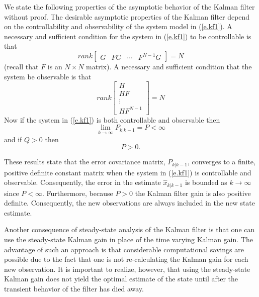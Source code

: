 	We state the following properties of the
asymptotic behavior of the Kalman filter without
proof.  The desirable asymptotic properties of the Kalman
filter depend on the controllability and observability of
the system model in (\ref{e.kf1}).  A necessary
and sufficient condition for the system in (\ref{e.kf1}) to be
controllable is that
%
\begin{equation}
rank[\begin{array}{cccc}G&FG&\cdots&F^{N-1}G\end{array}]=N
\label{e.kf31}
\end{equation}
%
(recall that $F$ is an $N\times N$ matrix).  A necessary and
sufficient condition that the system be observable is that
%
\begin{equation}
rank\left[\begin{array}{c}H\\HF\\\vdots\\HF^{N-1}\end{array}\right]=N
\label{e.kf32}
\end{equation}
%
Now if the system in (\ref{e.kf1}) is both controllable and observable
then
%
\begin{equation}
\lim_{k\rightarrow\infty}P_{k|k-1}=P<\infty
\label{e.kf33}
\end{equation}
%
and if $Q>0$ then
%
\begin{equation}
P>0.
\label{e.kf34}
\end{equation}
%

	These results state that the error covariance matrix,
$P_{k|k-1}$, converges to a finite, positive definite constant matrix
when the system in (\ref{e.kf1}) is controllable and observable.
Consequently, the error in the estimate $\hat{x}_{k|k-1}$ is bounded
as $k\rightarrow\infty$ since $P<\infty$.  Furthermore, because $P>0$
the Kalman filter gain is also positive definite.  Consequently, the new
observations are always included in the new state estimate.

	Another consequence of steady-state analysis of the Kalman
filter is that one can use the steady-state Kalman gain in place of
the time varying Kalman gain.  The advantage of such an approach is
that considerable computational savings are possible due to the fact
that one is not re-calculating the Kalman gain for each new observation.
It is important to realize, however, that using the steady-state
Kalman gain does not yield the optimal estimate of the state until after
the transient behavior of the filter has died away.

